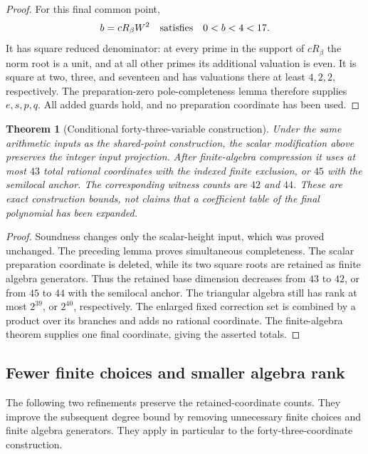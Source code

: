 \documentclass[11pt]{article}
\newtheorem{theorem}{Theorem}[section]
\theoremstyle{definition}
\begin{document}
\begin{proof}
For this final common point,
\[
 b=cR_\beta W^2\quad\hbox{satisfies}\quad
 0<b<4<17.
\]
It has square reduced denominator: at every prime in the support
of $cR_\beta$ the norm root is a unit, and at all other primes
its additional valuation is even.  It is square at two, three,
and seventeen and has valuations there at least $4,2,2$,
respectively.  The preparation-zero pole-completeness lemma
therefore supplies $e,s,p,q$.  All added guards hold, and no
preparation coordinate has been used.
\end{proof}

\begin{theorem}[Conditional forty-three-variable construction]
\label{thm:shared43}
Under the same arithmetic inputs as the shared-point construction,
the scalar modification above preserves the integer input projection.
After finite-algebra compression it uses at most $43$ total rational
coordinates with the indexed finite exclusion, or $45$ with the
semilocal anchor.  The corresponding witness counts are $42$ and
$44$.  These are exact construction bounds, not claims that a
coefficient table of the final polynomial has been expanded.
\end{theorem}
\begin{proof}
Soundness changes only the scalar-height input, which was proved
unchanged.  The preceding lemma proves simultaneous completeness.
The scalar preparation coordinate is deleted, while its two square
roots are retained as finite algebra generators.  Thus the retained
base dimension decreases from $43$ to $42$, or from $45$ to $44$
with the semilocal anchor.  The triangular algebra still has rank
at most $2^{39}$, or $2^{40}$, respectively.  The enlarged fixed
correction set is combined by a product over its branches and
adds no rational coordinate.  The finite-algebra theorem supplies
one final coordinate, giving the asserted totals.
\end{proof}


\subsection{Fewer finite choices and smaller algebra rank}
\label{subsec:shared-degree-refinements}

The following two refinements preserve the retained-coordinate counts.
They improve the subsequent degree bound by removing unnecessary
finite choices and finite algebra generators.  They apply in
particular to the forty-three-coordinate construction.
\end{document}
